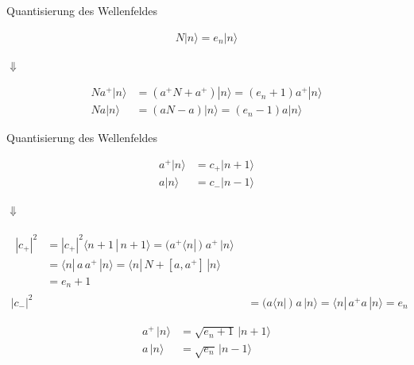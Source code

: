 \documentclass{beamer}
\begin{document}
\begin{frame}[t]{Quantisierung des Wellenfeldes}
	\vspace*{-0.5cm}
	\begin{center}
		\begin{minipage}{0.35\textwidth}
			\begin{align*}
				N|n\rangle = e_n|n\rangle
			\end{align*}
		\end{minipage}
		
		\vspace*{0.5cm}
		$\Downarrow$
		
		\begin{minipage}{0.35\textwidth}
			\begin{align*}
			Na^+|n\rangle &= (a^+N + a^+)|n\rangle = (e_n + 1)a^+|n\rangle \\
			Na|n\rangle &= (aN - a)|n\rangle = (e_n - 1)a|n\rangle
			\end{align*}
		\end{minipage}
	\end{center}
\end{frame}

\begin{frame}[t]{Quantisierung des Wellenfeldes}
	\vspace*{-0.5cm}
	\begin{center}
		\begin{minipage}{0.35\textwidth}
			\begin{align*}
			a^+|n\rangle &= c_+|n+1\rangle \\
			a|n\rangle &= c_-|n-1\rangle
			\end{align*}
		\end{minipage}
		
		\vspace*{0.5cm}
		$\Downarrow$
		
		\begin{minipage}{0.35\textwidth}
			\begin{align*}
			\begin{split}
			|c_+|^2 &= |c_+|^2 \langle n+1 \, | \, n+1 \rangle = ( a^+ \langle n |\,) \; a^+ \,| n \rangle \\
			&= \langle n |\, a \, a^+ \,|n \rangle = \langle n |\, N + [a,a^+] \,|n \rangle \\
			&= e_n+1
			\end{split}\\
			|c_-|^2 &= 	( a \langle n |\,) \; a \,| n \rangle = \langle n |\, a^+ a \,| n \rangle = e_n
			\end{align*}
		\end{minipage}
		\begin{minipage}{0.35\textwidth}
			\begin{align*}
			a^+\,|n\rangle &= \sqrt{e_n+1}\,|n+1\rangle \\
			a\,|n\rangle &= \sqrt{e_n}\,|n-1\rangle
			\end{align*}
		\end{minipage}
	\end{center}
\end{frame}
\end{document}
